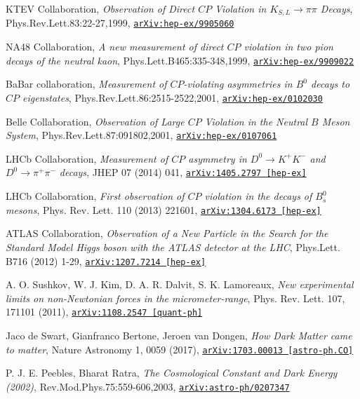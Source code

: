 \documentclass[11pt,a4paper,openright,twoside]{report}
\newcommand{\bibref}[4]{#1, \textit{#2}, #3 #4}
\begin{document}
\begin{thebibliography}{9}
	\bibref{KTEV Collaboration}{Observation of Direct $CP$ Violation in $K_{S,L}\to \pi\pi$ Decays}{Phys.Rev.Lett.83:22-27,1999,}{\href{https://arxiv.org/abs/hep-ex/9905060}{\texttt{arXiv:hep-ex/9905060}}}

 \bibref{NA48 Collaboration}{A new measurement of direct $CP$ violation in two pion decays of the neutral kaon}{Phys.Lett.B465:335-348,1999,}{\href{https://arxiv.org/abs/hep-ex/9909022}{\texttt{arXiv:hep-ex/9909022}}}

	\bibref{BaBar collaboration}{Measurement of $CP$-violating asymmetries in $B^0$ decays to $CP$ eigenstates}{Phys.Rev.Lett.86:2515-2522,2001,}{\href{https://arxiv.org/abs/hep-ex/0102030}{\texttt{arXiv:hep-ex/0102030}}}

	\bibref{Belle Collaboration}{Observation of Large $CP$ Violation in the Neutral $B$ Meson System}{Phys.Rev.Lett.87:091802,2001,}{\href{https://arxiv.org/abs/hep-ex/0107061}{\texttt{arXiv:hep-ex/0107061}}}

	\bibref{LHCb Collaboration}{Measurement of $CP$ asymmetry in $D^0 \to K^+ K^-$ and $D^0 \to \pi^+ \pi^-$ decays}{JHEP 07 (2014) 041,}{\href{https://arxiv.org/abs/1405.2797}{\texttt{arXiv:1405.2797 [hep-ex]}}}

	\bibref{LHCb Collaboration}{First observation of $CP$ violation in the decays of $B^0_s$ mesons}{Phys. Rev. Lett. 110 (2013) 221601,}{\href{https://arxiv.org/abs/1304.6173}{\texttt{arXiv:1304.6173 [hep-ex]}}}
	
	\bibref{ATLAS Collaboration}{Observation of a New Particle in the Search for the Standard Model Higgs boson with the ATLAS detector at the LHC}{Phys.Lett. B716 (2012) 1-29,}{\href{https://arxiv.org/abs/1207.7214}{\texttt{arXiv:1207.7214 [hep-ex]}}}
	
	\bibref{A. O. Sushkov, W. J. Kim, D. A. R. Dalvit, S. K. Lamoreaux}{New experimental limits on non-Newtonian forces in the micrometer-range}{Phys. Rev. Lett. 107, 171101 (2011),}{\href{https://arxiv.org/abs/1108.2547}{\texttt{arXiv:1108.2547 [quant-ph]}}}
	
	\bibref{Jaco de Swart, Gianfranco Bertone, Jeroen van Dongen}{How Dark Matter came to matter}{Nature Astronomy 1, 0059 (2017),}{\href{https://arxiv.org/abs/1703.00013}{\texttt{arXiv:1703.00013 [astro-ph.CO]}}}
	
	\bibref{P. J. E. Peebles, Bharat Ratra}{The Cosmological Constant and Dark Energy (2002)}{Rev.Mod.Phys.75:559-606,2003,}{\href{https://arxiv.org/abs/astro-ph/0207347}{\texttt{arXiv:astro-ph/0207347}}}


\end{thebibliography}
\end{document}
